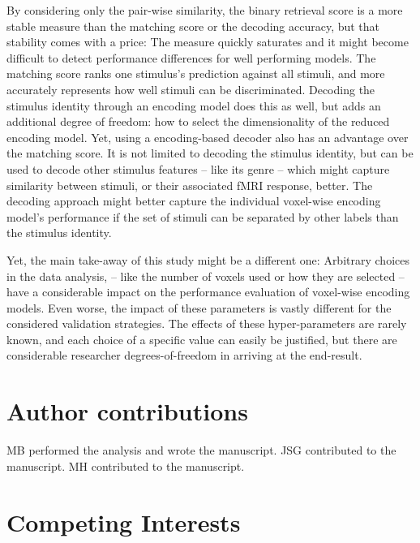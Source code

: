 By considering only the pair-wise similarity, the binary retrieval score is a more stable measure than the matching
score or the decoding accuracy, but that stability comes with a price: The measure
quickly saturates and it might become difficult to detect performance
differences for well performing models. The matching score ranks one
stimulus's prediction against all stimuli, and more accurately represents how
well stimuli can be discriminated. Decoding the stimulus identity through an
encoding model does this as well, but adds an additional degree of freedom: how to select the dimensionality
of the reduced encoding model. Yet, using a encoding-based  decoder also has an
advantage over the matching score. It is not limited to decoding the
stimulus identity, but can be used to decode other stimulus features -- like its
genre -- which might capture similarity between stimuli, or their associated
f{MRI} response, better. The decoding approach might better capture the individual voxel-wise encoding
model's performance if the set of stimuli can be separated by other labels than the stimulus identity.

Yet, the main take-away of this study might be a different one: Arbitrary
choices in the data analysis, -- like the number of voxels used or how they are
selected -- have a considerable impact on the performance evaluation of
voxel-wise encoding models. Even worse, the impact of these parameters is vastly
different for the considered validation strategies. The effects of these
hyper-parameters are rarely known, and each choice of a specific value can
easily be justified, but there are considerable researcher degrees-of-freedom
\citep{SNS11} in arriving at the end-result.

\section*{Author contributions}

MB performed the analysis and wrote the manuscript.
JSG contributed to the manuscript.
MH contributed to the manuscript.


\section*{Competing Interests}

